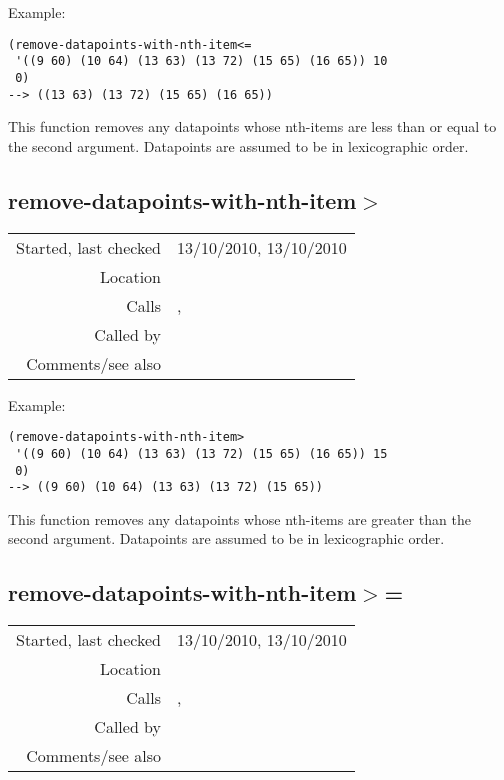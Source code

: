 \vspace{0.5cm}
\noindent Example:
\begin{verbatim}
(remove-datapoints-with-nth-item<=
 '((9 60) (10 64) (13 63) (13 72) (15 65) (16 65)) 10
 0)
--> ((13 63) (13 72) (15 65) (16 65))
\end{verbatim}

This function removes any datapoints whose nth-items
are less than or equal to the second argument.
Datapoints are assumed to be in lexicographic
order.


\subsection*{remove-datapoints-with-nth-item$>$}\label{fun:remove-datapoints-with-nth-item>}

\vspace{0.3cm}
\begin{tabular}{r|p{8cm}}
Started, last checked & 13/10/2010, 13/10/2010 \\
Location & \nameref{sec:generating-beat-MNN-spacing-for-and-back} \\
Calls & \nameref{fun:index-1st-sublist-item>}, \nameref{fun:nth-list-of-lists} \\
Called by & \nameref{fun:unite-datapoints} \\
Comments/see also &
\end{tabular}

\vspace{0.5cm}
\noindent Example:
\begin{verbatim}
(remove-datapoints-with-nth-item>
 '((9 60) (10 64) (13 63) (13 72) (15 65) (16 65)) 15
 0)
--> ((9 60) (10 64) (13 63) (13 72) (15 65))
\end{verbatim}

This function removes any datapoints whose nth-items
are greater than the second argument. Datapoints are
assumed to be in lexicographic order.


\subsection*{remove-datapoints-with-nth-item$>$=}\label{fun:remove-datapoints-with-nth-item>=}

\vspace{0.3cm}
\begin{tabular}{r|p{8cm}}
Started, last checked & 13/10/2010, 13/10/2010 \\
Location & \nameref{sec:generating-beat-MNN-spacing-for-and-back} \\
Calls & \nameref{fun:index-1st-sublist-item>=}, \nameref{fun:nth-list-of-lists} \\
Called by & \nameref{fun:unite-datapoints} \\
Comments/see also &
\end{tabular}

